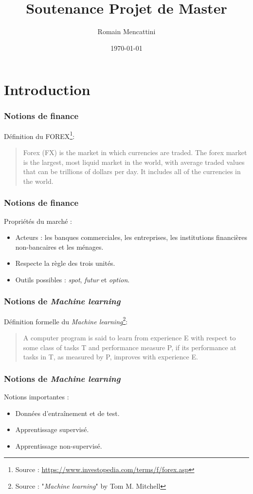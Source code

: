 \documentclass{beamer}
\title{Soutenance Projet de Master}
\author{Romain Mencattini}
\institute{Université de Genève}
\date{\today}
\begin{document}
  \begin{frame}
  \titlepage
  \end{frame}

	\section{Introduction} %
	
	\begin{frame}
		\frametitle{Notions de finance}
		Définition du FOREX\footnote{Source : \url{https://www.investopedia.com/terms/f/forex.asp}}: 
		\begin{quote}
			Forex (FX) is the market in which currencies are traded. The forex market is the largest, most liquid market in the world, with average traded values that can be trillions of dollars per day. It includes all of the currencies in the world.
		\end{quote}
	\end{frame}

	\begin{frame}
	\frametitle{Notions de finance}
	Propriétés du marché :
		\begin{itemize}
			\item Acteurs : les banques commerciales, les entreprises, les institutions financières non-bancaires et les ménages.
			\item Respecte la règle des trois unités.
			\item Outils possibles : \textit{spot}, \textit{futur} et \textit{option}.
	\end{itemize}
	\end{frame}

	\begin{frame}
		\frametitle{Notions de \textit{Machine learning}}
		Définition formelle du \textit{Machine learning}\footnote{Source : "\textit{Machine learning}" by Tom M. Mitchell}:
		\begin{quote}
			A computer program is said to learn from experience E with respect to some class of tasks T and performance measure P, if its performance at tasks in T, as measured by P, improves with experience E.
		\end{quote}
	\end{frame}

	\begin{frame}
		\frametitle{Notions de \textit{Machine learning}}
		Notions importantes :
		\begin{itemize}
			\item Données d'entraînement et de test.
			\item Apprentissage supervisé.
			\item Apprentissage non-supervisé.
		\end{itemize}
	\end{frame}
\end{document}
